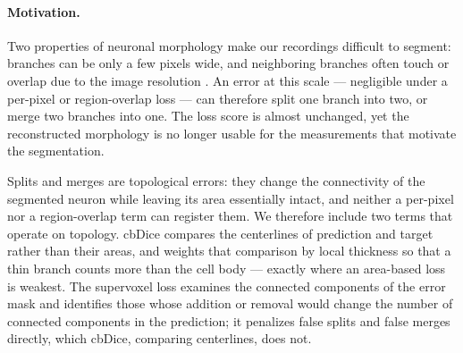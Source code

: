 \documentclass[11pt,a4paper]{article}
\makeatletter
\let\SD@subsection\subsection
\renewcommand\subsection{\FloatBarrier\@ifstar{\SD@subsection*}{\SD@subsection}}
\makeatother
\begin{document}
\subsection{Topology-preserving loss}
\label{sec:met:loss}

\paragraph{Motivation.}
Two properties of neuronal morphology make our recordings difficult to
segment: branches can be only a few pixels wide, and neighboring branches
often touch or overlap due to the image resolution
\cite{grim2025supervoxel}. An error at this scale --- negligible under a
per-pixel or region-overlap loss --- can therefore split one branch into
two, or merge two branches into one. The loss score is almost unchanged, yet
the reconstructed morphology is no longer usable for the measurements that
motivate the segmentation.

Splits and merges are topological errors: they change the connectivity of
the segmented neuron while leaving its area essentially intact, and neither
a per-pixel nor a region-overlap term can register them. We therefore
include two terms that operate on topology. cbDice \cite{shi2024cbdice}
compares the centerlines of prediction and target rather than their areas,
and weights that comparison by local thickness so that a thin branch counts
more than the cell body --- exactly where an area-based loss is weakest. The
supervoxel loss \cite{grim2025supervoxel} examines the connected components
of the error mask and identifies those whose addition or removal would
change the number of connected components in the prediction; it penalizes
false splits and false merges directly, which cbDice, comparing centerlines,
does not.
\end{document}
